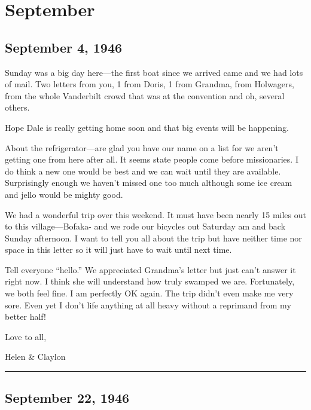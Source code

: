 \documentclass[
]{book}
\begin{document}
\hypertarget{september}{%
\section{September}\label{september}}

\hypertarget{september-4-1946}{%
\subsection{September 4, 1946}\label{september-4-1946}}

Sunday was a big day here---the first boat since we arrived came and we had lots of mail. Two letters from you, 1 from Doris, 1 from Grandma, from Holwagers, from the whole Vanderbilt crowd that was at the convention and oh, several others.

Hope Dale is really getting home soon and that big events will be happening.

About the refrigerator---are glad you have our name on a list for we aren't getting one from here after all. It seems state people come before missionaries. I do think a new one would be best and we can wait until they are available. Surprisingly enough we haven't missed one too much although some ice cream and jello would be mighty good.

We had a wonderful trip over this weekend. It must have been nearly 15 miles out to this village---Bofaka- and we rode our bicycles out Saturday am and back Sunday afternoon. I want to tell you all about the trip but have neither time nor space in this letter so it will just have to wait until next time.

Tell everyone ``hello.'' We appreciated Grandma's letter but just can't answer it right now. I think she will understand how truly swamped we are. Fortunately, we both feel fine. I am perfectly OK again. The trip didn't even make me very sore. Even yet I don't life anything at all heavy without a reprimand from my better half!

Love to all,

Helen \& Claylon

\begin{center}\rule{0.5\linewidth}{0.5pt}\end{center}

\hypertarget{september-22-1946}{%
\subsection{September 22, 1946}\label{september-22-1946}}
\end{document}
